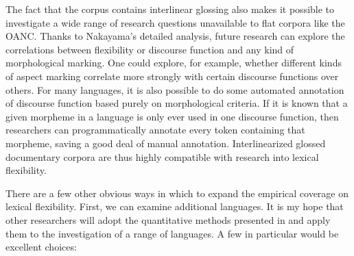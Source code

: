 The fact that the  corpus contains interlinear glossing also makes it possible to investigate a wide range of research questions unavailable to flat corpora like the OANC. Thanks to Nakayama's detailed analysis, future research can explore the correlations between flexibility or discourse function and any kind of morphological marking. One could explore, for example, whether different kinds of aspect marking correlate more strongly with certain discourse functions over others. For many languages, it is also possible to do some automated annotation of discourse function based purely on morphological criteria. If it is known that a given morpheme in a language is only ever used in one discourse function, then researchers can programmatically annotate every token containing that morpheme, saving a good deal of manual annotation. Interlinearized glossed documentary corpora are thus highly compatible with research into lexical flexibility.

There are a few other obvious ways in which to expand the empirical coverage on lexical flexibility. First, we can examine additional languages. It is my hope that other researchers will adopt the quantitative methods presented in  and apply them to the investigation of a range of languages. A few in particular would be excellent choices:

